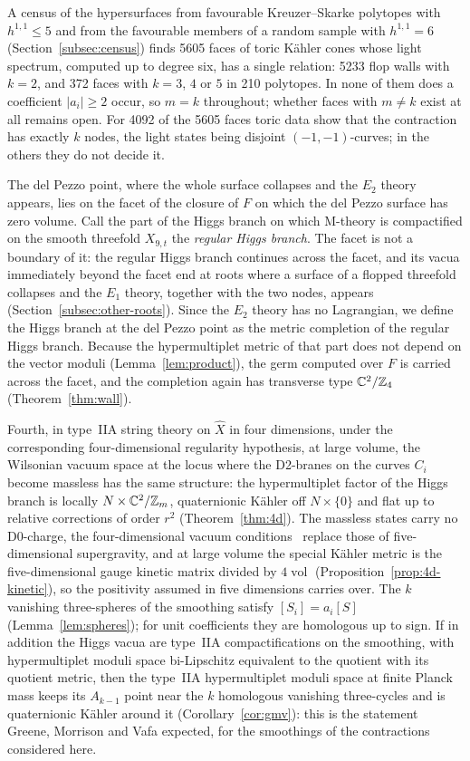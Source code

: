 A census of the hypersurfaces from favourable Kreuzer--Skarke polytopes with $h^{1,1}\leq5$ and from the
favourable members of a random sample with $h^{1,1}=6$ (Section~\ref{subsec:census}) finds
5605 faces of toric K\"ahler cones whose light spectrum, computed up to degree six, has a single
relation: 5233 flop walls with $k=2$, and 372 faces with $k=3$, $4$ or $5$ in 210 polytopes. In none of
them does a coefficient $|a_i|\geq2$ occur, so $m=k$ throughout; whether faces with $m\neq k$ exist at all
remains open. For 4092 of the 5605 faces toric data show that the contraction has exactly $k$ nodes, the light
states being disjoint $(-1,-1)$-curves; in the others they do not decide it.

The del Pezzo point, where the whole surface collapses and the $E_2$ theory appears, lies on the
facet of the closure of $F$ on which the del Pezzo surface has zero volume. Call the part of the Higgs branch on which M-theory is compactified
on the smooth threefold $X_{9,t}$ the \emph{regular Higgs branch}. The facet is not a boundary of
it: the regular Higgs branch continues across the facet, and its vacua immediately beyond the facet end
at roots where a surface of a flopped threefold collapses and the $E_1$ theory, together with the two
nodes, appears
(Section~\ref{subsec:other-roots}). Since the $E_2$ theory has no Lagrangian, we define the Higgs
branch at the del Pezzo point as the metric completion of the regular Higgs branch. Because the hypermultiplet metric of
that part does not depend on the vector moduli (Lemma~\ref{lem:product}), the germ computed
over $F$ is carried across the facet, and the completion again has transverse type
$\mathbb C^2/\mathbb Z_4$ (Theorem~\ref{thm:wall}).

Fourth, in type~IIA string theory on $\widehat X$ in four dimensions, under the corresponding
four-dimensional regularity hypothesis, at large volume, the Wilsonian vacuum space at the locus where the D2-branes on the
curves $C_i$ become massless has the same structure: the hypermultiplet factor of the Higgs branch is
locally $N\times\mathbb C^2/\mathbb Z_m$, quaternionic K\"ahler off $N\times\{0\}$ and flat up to relative corrections of
order $r^2$ (Theorem~\ref{thm:4d}). The massless states carry no D0-charge, the four-dimensional vacuum
conditions~\cite{Hristov:2009} replace those of five-dimensional supergravity, and at large volume the
special K\"ahler metric is the five-dimensional gauge kinetic matrix divided by $4\operatorname{vol}$
(Proposition~\ref{prop:4d-kinetic}), so the positivity assumed in five dimensions carries over. The $k$
vanishing three-spheres of the smoothing satisfy $[S_i]=a_i[S]$ (Lemma~\ref{lem:spheres}); for unit
coefficients they are homologous up to sign. If in addition the Higgs vacua are type~IIA compactifications on the
smoothing, with hypermultiplet moduli space bi-Lipschitz equivalent to the quotient with its quotient metric, then the type~IIA
hypermultiplet moduli space at finite Planck mass keeps its $A_{k-1}$ point near the $k$ homologous
vanishing three-cycles and is quaternionic K\"ahler around it (Corollary~\ref{cor:gmv}): this is the
statement Greene, Morrison and Vafa expected, for the smoothings of the contractions considered here.

